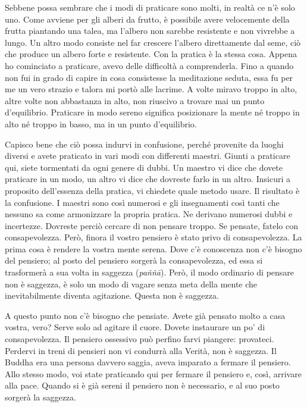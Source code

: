Sebbene possa sembrare che i modi di praticare sono molti, in realtà ce
n'è solo uno. Come avviene per gli alberi da frutto, è possibile avere
velocemente della frutta piantando una talea, ma l'albero non sarebbe
resistente e non vivrebbe a lungo. Un altro modo consiste nel far
crescere l'albero direttamente dal seme, ciò che produce un albero forte
e resistente. Con la pratica è la stessa cosa. Appena ho cominciato a
praticare, avevo delle difficoltà a comprenderla. Fino a quando non fui
in grado di capire in cosa consistesse la meditazione seduta, essa fu
per me un vero strazio e talora mi portò alle lacrime. A volte miravo
troppo in alto, altre volte non abbastanza in alto, non riuscivo a
trovare mai un punto d'equilibrio. Praticare in modo sereno significa
posizionare la mente né troppo in alto né troppo in basso, ma in un
punto d'equilibrio.

Capisco bene che ciò possa indurvi in confusione, perché provenite da
luoghi diversi e avete praticato in vari modi con differenti maestri.
Giunti a praticare qui, siete tormentati da ogni genere di dubbi. Un
maestro vi dice che dovete praticare in un modo, un altro vi dice che
dovreste farlo in un altro. Insicuri a proposito dell'essenza della
pratica, vi chiedete quale metodo usare. Il risultato è la confusione. I
maestri sono così numerosi e gli insegnamenti così tanti che nessuno sa
come armonizzare la propria pratica. Ne derivano numerosi dubbi e
incertezze. Dovreste perciò cercare di non pensare troppo. Se pensate,
fatelo con consapevolezza. Però, finora il vostro pensiero è stato privo
di consapevolezza. La prima cosa è rendere la vostra mente serena. Dove
c'è conoscenza non c'è bisogno del pensiero; al posto del pensiero
sorgerà la consapevolezza, ed essa si trasformerà a sua volta in
saggezza (\emph{paññā}). Però, il modo ordinario di pensare non è
saggezza, è solo un modo di vagare senza meta della mente che
inevitabilmente diventa agitazione. Questa non è saggezza.

A questo punto non c'è bisogno che pensiate. Avete già pensato molto a
casa vostra, vero? Serve solo ad agitare il cuore. Dovete instaurare un
po' di consapevolezza. Il pensiero ossessivo può perfino farvi piangere:
provateci. Perdervi in treni di pensieri non vi condurrà alla Verità,
non è saggezza. Il Buddha era una persona davvero saggia, aveva imparato
a fermare il pensiero. Allo stesso modo, voi state praticando qui per
fermare il pensiero e, così, arrivare alla pace. Quando si è già sereni
il pensiero non è necessario, e al suo posto sorgerà la saggezza.

